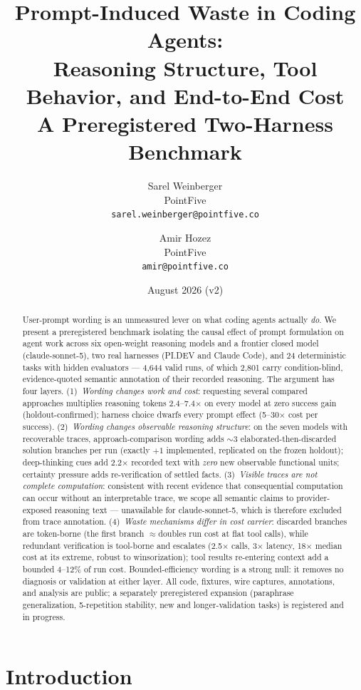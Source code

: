 \documentclass[11pt]{article}
\title{Prompt-Induced Waste in Coding Agents:\\
Reasoning Structure, Tool Behavior, and End-to-End Cost\\
\large A Preregistered Two-Harness Benchmark}
\author{Sarel Weinberger\\
PointFive\\
\small\texttt{sarel.weinberger@pointfive.co}
\and
Amir Hozez\\
PointFive\\
\small\texttt{amir@pointfive.co}}
\date{August 2026 (v2)}
\newcommand{\pidev}{PI.DEV}
\newcommand{\cc}{Claude Code}
\newcommand{\xd}{$\times$}
\begin{document}
\maketitle

\begin{abstract}
User-prompt wording is an unmeasured lever on what coding agents actually
\emph{do}. We present a preregistered benchmark isolating the causal effect
of prompt formulation on agent work across six open-weight reasoning models
and a frontier closed model (claude-sonnet-5), two real harnesses (\pidev{}
and \cc{}), and 24 deterministic tasks with hidden evaluators --- 4{,}644
valid runs, of which 2{,}801 carry condition-blind,
evidence-quoted semantic annotation of their recorded reasoning. The
argument has four layers. (1)~\emph{Wording changes work and cost}:
requesting several compared approaches multiplies reasoning tokens
2.4--7.4\xd{} on every model at zero success gain (holdout-confirmed);
harness choice dwarfs every prompt effect (5--30\xd{} cost per success).
(2)~\emph{Wording changes observable reasoning structure}: on the seven
models with recoverable traces, approach-comparison wording adds
$\sim$3 elaborated-then-discarded solution branches per run (exactly $+1$
implemented, replicated on the frozen holdout); deep-thinking cues add
2.2\xd{} recorded text with \emph{zero} new observable functional units;
certainty pressure adds re-verification of settled facts.
(3)~\emph{Visible traces are not complete computation}: consistent with
recent evidence that consequential computation can occur without an
interpretable trace, we scope all semantic claims to provider-exposed
reasoning text --- unavailable for claude-sonnet-5, which is therefore
excluded from trace annotation. (4)~\emph{Waste mechanisms differ in cost
carrier}: discarded branches are token-borne (the first branch
$\approx$doubles run cost at flat tool calls), while redundant verification
is tool-borne and escalates (2.5\xd{} calls, 3\xd{} latency, 18\xd{} median
cost at its extreme, robust to winsorization); tool results re-entering
context add a bounded 4--12\% of run cost. Bounded-efficiency wording is a
strong null: it removes no diagnosis or validation at either layer. All
code, fixtures, wire captures, annotations, and analysis are public; a
separately preregistered expansion (paraphrase generalization, 5-repetition
stability, new and longer-validation tasks) is registered and in progress.
\end{abstract}

\section{Introduction}
\end{document}
